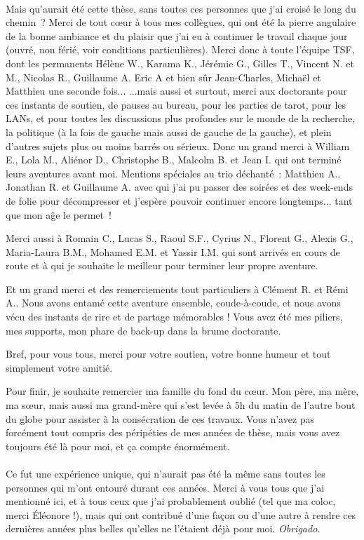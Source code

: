 \documentclass[french, a4paper, 11pt, twoside, pdftex]{StyleThese}
\begin{document}
{\paragraph*{}
	Mais qu'aurait été cette thèse, sans toutes ces personnes que j'ai croisé le long du chemin~?
	Merci de tout cœur à tous mes  collègues, qui ont été la pierre angulaire de la bonne ambiance et du plaisir que j'ai eu à continuer le travail chaque jour \small{(ouvré, non férié, voir conditions particulières)}. Merci donc à toute l'équipe TSF, dont les permanents Hélène W., Karama K., Jérémie G., Gilles T., Vincent N. et M., Nicolas R., Guillaume A. Eric A et bien sûr Jean-Charles, Michaël et Matthieu une seconde fois... 
	\break
	...mais aussi et surtout, merci aux doctorants pour ces instants de soutien, de pauses au bureau, pour les parties de tarot, pour les LANs, et pour toutes les discussions plus profondes sur le monde de la recherche, la politique (à la fois de gauche mais aussi de gauche de la gauche), et plein d'autres sujets plus ou moins barrés ou sérieux. Donc un grand merci à William E., Lola M., Aliénor D., Christophe B., Malcolm B. et Jean I. qui ont terminé leurs aventures avant moi. 
	Mentions spéciales au trio déchanté~: Matthieu A., Jonathan R. et Guillaume A. avec qui j'ai pu passer des soirées et des week-ends de folie pour décompresser et j'espère pouvoir continuer encore longtemps... tant que mon aĝe le permet~!
		
	Merci aussi à Romain C., Lucas S., Raoul S.F., Cyrius N., Florent G., Alexis G., Maria-Laura B.M., Mohamed E.M. et Yassir I.M. qui sont arrivés en cours de route et à qui je souhaite le meilleur pour terminer leur propre aventure. 
	
	Et un grand merci et des remerciements tout particuliers à Clément R. et Rémi A.. Nous avons entamé cette aventure ensemble, coude-à-coude, et nous avons vécu des instants de rire et de partage mémorables ! Vous avez été mes piliers, mes supports, mon phare de back-up dans la brume doctorante. 
	
	Bref, pour vous tous, merci pour votre soutien, votre bonne humeur et tout simplement votre amitié.
	
	Pour finir, je souhaite remercier ma famille du fond du cœur. Mon père, ma mère, ma sœur, mais aussi ma grand-mère qui s'est levée à 5h du matin de l'autre bout du globe pour assister à la consécration de ces travaux. Vous n'avez pas forcément tout compris des péripéties de mes années de thèse, mais vous avez toujours été là pour moi, et ça compte énormément. 
	
\paragraph*{}
	Ce fut une expérience unique, qui n'aurait pas été la même sans toutes les personnes qui m'ont entouré durant ces années. Merci à vous tous que j'ai mentionné ici, et à tous ceux que j'ai probablement oublié (tel que ma coloc, merci Éléonore !), mais qui ont contribué d'une façon ou d'une autre à rendre ces dernières années plus belles qu'elles ne l'étaient déjà pour moi. \textit{Obrigado}.
}
\end{document}
